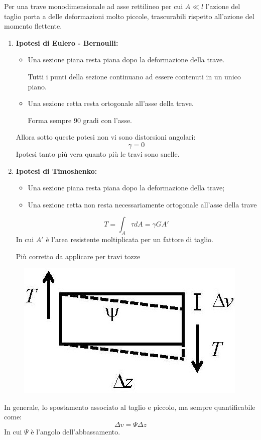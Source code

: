 \documentclass{article}
\begin{document}
\begin{adjustwidth}{2in}{}
\begin{itemize}
			Per una trave monodimensionale ad asse rettilineo per cui $A\ll l$ l'azione del taglio porta a delle deformazioni molto piccole, trascurabili rispetto all'azione del momento flettente.
			
			\begin{enumerate}
			\item \textbf{Ipotesi di Eulero - Bernoulli:}
			\begin{itemize}
				\item Una sezione piana resta piana dopo la deformazione della trave.
				
				Tutti i punti della sezione continuano ad essere contenuti in un unico piano.
				
				\item Una sezione retta resta ortogonale all’asse della trave. 
				
				Forma sempre 90 gradi con l'asse.
			\end{itemize}
			Allora sotto queste potesi non vi sono distorsioni angolari:
			\[ \gamma = 0 \]
			Ipotesi tanto più vera quanto più le travi sono snelle.
			
			\item \textbf{Ipotesi di Timoshenko:}
			\begin{itemize}
		    \item Una sezione piana resta piana dopo la deformazione della trave; 
		    \item Una sezione retta non resta necessariamente ortogonale all’asse della trave
			\end{itemize}
			\[ T = \int_{A}\tau dA = \gamma GA' \]
			In cui $A'$ è l'area resistente moltiplicata per un fattore di taglio. \newline 
			
			Più corretto da applicare per travi tozze
			\end{enumerate}
			
\begin{figure}[H]
	\centering
	\includegraphics[width=0.25\linewidth]{"immagini/1.PARTE8_Pagina_09"}
\end{figure}
			In generale, lo spostamento associato al taglio e piccolo, ma sempre quantificabile come:
			\[ \Delta v = \Psi \Delta z \]
			In cui $\Psi$ è l'angolo dell'abbassamento. \newline 
			

\end{itemize}
\end{adjustwidth}
\end{document}

